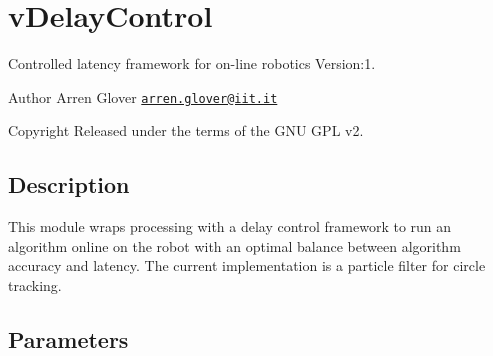 \hypertarget{group__vDelayControl}{}\section{v\+Delay\+Control}
\label{group__vDelayControl}
Controlled latency framework for on-\/line robotics Version\+:1. \begin{DoxyAuthor}{Author}
Arren Glover \href{mailto:arren.glover@iit.it}{\tt arren.\+glover@iit.\+it} ~\newline
 
\end{DoxyAuthor}
\begin{DoxyCopyright}{Copyright}
Released under the terms of the G\+NU G\+PL v2. 
\end{DoxyCopyright}
\hypertarget{group__zynqGrabber_intro_sec}{}\subsection{Description}\label{group__zynqGrabber_intro_sec}
This module wraps processing with a delay control framework to run an algorithm online on the robot with an optimal balance between algorithm accuracy and latency. The current implementation is a particle filter for circle tracking.\hypertarget{group__zynqGrabber_parameters_sec}{}\subsection{Parameters}\label{group__zynqGrabber_parameters_sec}

